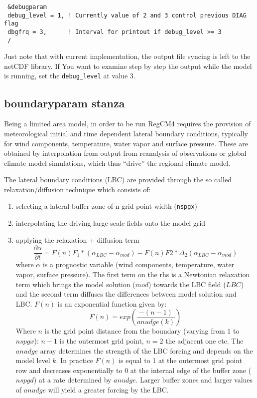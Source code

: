 {\footnotesize
\begin{Verbatim}
 &debugparam
 debug_level = 1, ! Currently value of 2 and 3 control previous DIAG flag
 dbgfrq = 3,      ! Interval for printout if debug_level >= 3
 /
\end{Verbatim}
}

Just note that with current implementation, the output file syncing is left
to the netCDF library. If You want to examine step by step the output while
the model is running, set the \verb=debug_level= at value 3.

\subsection{boundaryparam stanza}

Being a limited area model, in order to be run RegCM4 requires the provision
of meteorological initial and time dependent lateral boundary conditions,
typically for wind components, temperature, water vapor and surface pressure.
These are obtained by interpolation from output from reanalysis of observations
or global climate model simulations, which thus “drive” the regional climate
model.

The lateral boundary conditions (LBC) are provided through the so called
relaxation/diffusion technique which consists of:

\begin{enumerate}
\item selecting a lateral buffer zone of n grid point width (\verb=nspgx=)
\item interpolating the driving large scale fields onto the model grid
\item applying the relaxation + diffusion term
\begin{equation}
\frac{\partial \alpha}{\partial t} = F(n)F_1 * (\alpha_{LBC}-\alpha_{mod}) -
    F(n)F2 * \Delta_2(\alpha_{LBC}-\alpha_{mod})
\end{equation}
where $\alpha$ is a prognostic variable (wind components, temperature, water
vapor, surface pressure). The first term on the rhs is a Newtonian relaxation
term which brings the model solution ($mod$) towards the LBC field ($LBC$)
and the second term diffuses the differences between model solution and LBC.
$F(n)$ is an exponential function given by:
\begin{equation}
F(n) = exp\left(\frac{-(n-1)}{anudge(k)}\right)
\end{equation}
Where $n$ is the grid point distance from the boundary (varying from $1$ to
$nspgx$): $n-1$ is the outermost grid point, $n=2$ the adjacent one etc.
The $anudge$ array determines the strength of the LBC forcing and depends on
the model level $k$. In practice $F(n)$ is equal to 1 at the outermost grid
point row and decreases exponentially to $0$ at the internal edge of the buffer
zone ($nspgd$) at a rate determined by $anudge$. Larger buffer zones and larger
values of $anudge$ will yield a greater forcing by the LBC.  
\end{enumerate}

